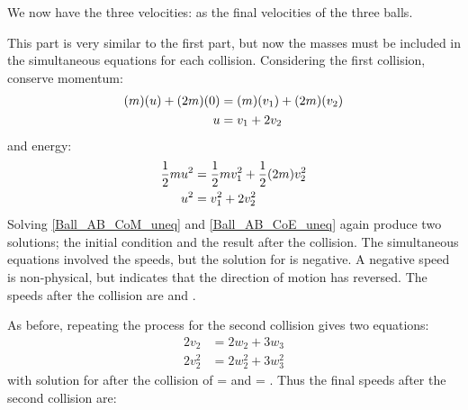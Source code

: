 \begin{problem}[A1969AMIIQ8l]
{{We now have the three velocities:
as the final velocities of the three balls.


This part is very similar to the first part, but now the masses must be included in the simultaneous equations for each collision. Considering the first collision, conserve momentum:
\begin{eqnarray} \notag 
(m)(u) + (2m)(0) &= (m)(v_{1}) + (2m)(v_{2}) \\ 
u &= v_{1} + 2v_{2} \label{Ball_AB_CoM_uneq} 
\end{eqnarray}
and energy:
\begin{eqnarray} \notag 
\frac{1}{2}mu^{2} &= \frac{1}{2}mv_{1}^{2} + \frac{1}{2}(2m)v_{2}^{2} \\ 
u^{2} &= v_{1}^{2} + 2v_{2}^{2} \label{Ball_AB_CoE_uneq} 
\end{eqnarray}
Solving \ref{Ball_AB_CoM_uneq} and \ref{Ball_AB_CoE_uneq} again produce two solutions; the initial condition and the result after the collision. The simultaneous equations involved the speeds, but the solution for  is negative. A negative speed is non-physical, but indicates that the direction of motion has reversed. The speeds after the collision are  and .

As before, repeating the process for the second collision gives two equations:
\begin{eqnarray*} 
2v_{2} &= 2w_{2} + 3w_{3} \\
 2v_{2}^{2} &= 2w_{2}^{2} + 3w_{3}^{2} 
 \end{eqnarray*}
with solution for after the collision of  =  and  = . Thus the final speeds after the second collision are:

}}
\end{problem}
